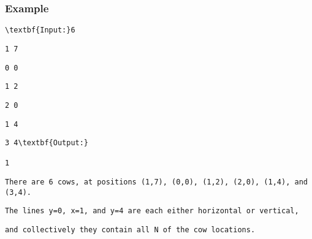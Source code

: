 \subsubsection{Example}
\begin{verbatim}
\textbf{Input:}6 \end{verbatim}
\begin{verbatim}
1 7 \end{verbatim}
\begin{verbatim}
0 0 \end{verbatim}
\begin{verbatim}
1 2 \end{verbatim}
\begin{verbatim}
2 0 \end{verbatim}
\begin{verbatim}
1 4 \end{verbatim}
\begin{verbatim}
3 4\textbf{Output:}

1

\end{verbatim}
\begin{verbatim}
There are 6 cows, at positions (1,7), (0,0), (1,2), (2,0), (1,4), and (3,4).\end{verbatim}
\begin{verbatim}
The lines y=0, x=1, and y=4 are each either horizontal or vertical, \end{verbatim}
\begin{verbatim}
and collectively they contain all N of the cow locations.\end{verbatim}
